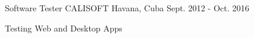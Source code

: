 


\begin{cventries}


\cventry
{Software Tester} %
{CALISOFT} %
{Havana, Cuba} %
{Sept. 2012 - Oct. 2016} %
{ %
\begin{cvitems}
\item {Testing Web and Desktop Apps}
\end{cvitems}
}


\end{cventries}

